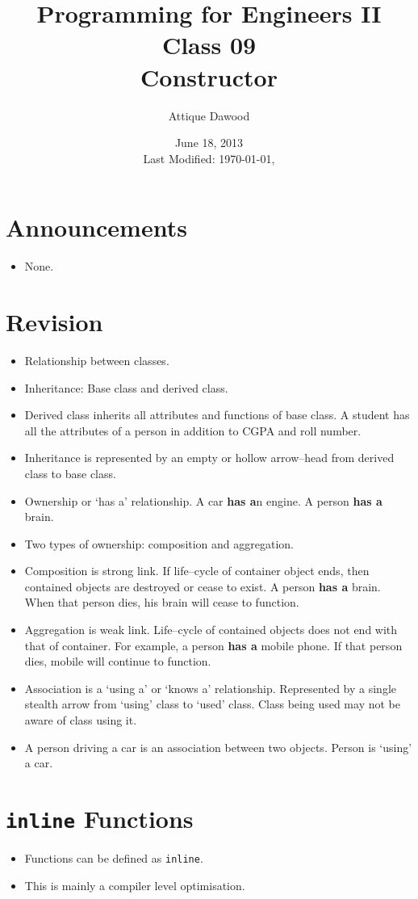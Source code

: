 \documentclass[12pt,a4paper]{article}
\title{\vspace{-2cm}Programming for Engineers II\\Class 09\\Constructor}
\author{Attique Dawood}
\date{June 18, 2013\\[0.2cm] Last Modified: \today, \currenttime}
\begin{document}
\maketitle
\section{Announcements}
\begin{itemize}
\item None.
\end{itemize}
\section{Revision}
\begin{itemize}
\item Relationship between classes.
\item Inheritance: Base class and derived class.
\item Derived class inherits all attributes and functions of base class. A student has all the attributes of a person in addition to CGPA and roll number.
\item Inheritance is represented by an empty or hollow arrow--head from derived class to base class.
\item Ownership or `has a' relationship. A car \textbf{has a}n engine. A person \textbf{has a} brain.
\item Two types of ownership: composition and aggregation.
\item Composition is strong link. If life--cycle of container object ends, then contained objects are destroyed or cease to exist. A person \textbf{has a} brain. When that person dies, his brain will cease to function.
\item Aggregation is weak link. Life--cycle of contained objects does not end with that of container. For example, a person \textbf{has a} mobile phone. If that person dies, mobile will continue to function.
\item Association is a `using a' or `knows a' relationship. Represented by a single stealth arrow from `using' class to `used' class. Class being used may not be aware of class using it.
\item A person driving a car is an association between two objects. Person is `using' a car.
\end{itemize}
\section{\texttt{inline} Functions}
\begin{itemize}
\item Functions can be defined as \verb|inline|.
\item This is mainly a compiler level optimisation.
\end{itemize}
\end{document}
